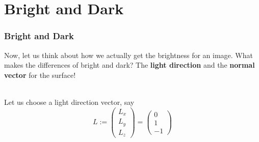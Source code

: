 \documentclass[12pt, t]{beamer}
\newcommand{\nullspace}{~\\[15pt]}
\begin{document}

\section{Bright and Dark}
\begin{frame}
    \frametitle{Bright and Dark}

    Now, let us think about how we actually get the brightness for an image. What makes the
    differences of bright and dark? The \textbf{light direction} and the \textbf{normal vector} for
    the surface!

    \nullspace
    Let us choose a light direction vector, say
    \begin{equation*}
        L :=
        \begin{pmatrix}
            L_x \\
            L_y \\
            L_z
        \end{pmatrix}
        =
        \begin{pmatrix}
            0 \\
            1 \\
            -1
        \end{pmatrix}
    \end{equation*}

\end{frame}

\end{document}
